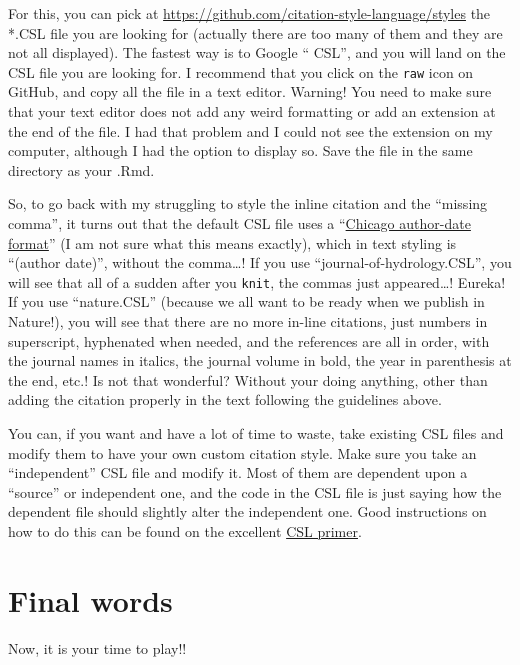 \documentclass[]{book}
\theoremstyle{definition}
\theoremstyle{definition}
\theoremstyle{definition}
\theoremstyle{remark}
\begin{document}
For this, you can pick at
\url{https://github.com/citation-style-language/styles} the *.CSL file
you are looking for (actually there are too many of them and they are
not all displayed). The fastest way is to Google `` CSL'', and you will
land on the CSL file you are looking for. I recommend that you click on
the \texttt{raw} icon on GitHub, and copy all the file in a text editor.
Warning! You need to make sure that your text editor does not add any
weird formatting or add an extension at the end of the file. I had that
problem and I could not see the extension on my computer, although I had
the option to display so. Save the file in the same directory as your
.Rmd.

So, to go back with my struggling to style the inline citation and the
``missing comma'', it turns out that the default CSL file uses a
``\href{http://rmarkdown.rstudio.com/authoring_bibliographies_and_citations.html\#citation_styles}{Chicago
author-date format}'' (I am not sure what this means exactly), which in
text styling is ``(author date)'', without the comma\ldots{}! If you use
``journal-of-hydrology.CSL'', you will see that all of a sudden after
you \texttt{knit}, the commas just appeared\ldots{}! Eureka! If you use
``nature.CSL'' (because we all want to be ready when we publish in
Nature!), you will see that there are no more in-line citations, just
numbers in superscript, hyphenated when needed, and the references are
all in order, with the journal names in italics, the journal volume in
bold, the year in parenthesis at the end, etc.! Is not that wonderful?
Without your doing anything, other than adding the citation properly in
the text following the guidelines above.

You can, if you want and have a lot of time to waste, take existing CSL
files and modify them to have your own custom citation style. Make sure
you take an ``independent'' CSL file and modify it. Most of them are
dependent upon a ``source'' or independent one, and the code in the CSL
file is just saying how the dependent file should slightly alter the
independent one. Good instructions on how to do this can be found on the
excellent
\href{http://docs.citationstyles.org/en/stable/primer.html}{CSL primer}.

\chapter{Final words}\label{final-words}

Now, it is your time to play!!


\end{document}
